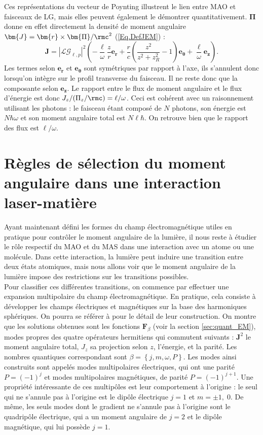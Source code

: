 Ces représentations du vecteur de Poynting illustrent le lien entre MAO et faisceaux de LG, mais elles peuvent également le démontrer quantitativement. $\bm{\Pi}$ donne en effet directement la densité de moment angulaire $\bm{J} = \bm{r}\times\bm{\Pi}/\rmc^2$ (\ref{Eq.DefJEM}) :
\begin{equation*}
\bm{J} = \left|\mathcal{LG}_{\ell,p}\right|^2\left(-\frac{\ell}{\omega}\frac{z}{r}\bm{e_r}+\frac{r}{c}\left(\frac{z^2}{z^2+z_R^2} -1\right)\bm{e_\theta}+\frac{\ell}{\omega}\bm{e_z}\right).
\end{equation*}
Les termes selon $\bm{e_r}$ et $\bm{e_\theta}$ sont symétriques par rapport à l'axe, ils s'annulent donc lorsqu'on intègre sur le profil transverse du faisceau. Il ne reste donc que la composante selon $\bm{e_z}$. Le rapport entre le flux de moment angulaire et le flux d'énergie est donc $J_z/(\Pi_z/\rmc) = \ell/\omega$. Ceci est cohérent avec un raisonnement utilisant les photons : le faisceau étant composé de $N$ photons, son énergie est $N\hbar\omega$ et son moment angulaire total est $N\ell\hbar$. On retrouve bien que le rapport des flux est $\ell/\omega$.

\section{Règles de sélection du moment angulaire dans une interaction laser-matière}
\label{sec:selectionrules}
Ayant maintenant défini les formes du champ électromagnétique utiles en pratique pour contrôler le moment angulaire de la lumière, il nous reste à étudier le rôle respectif du MAO et du MAS dans une interaction avec un atome ou une molécule. Dans cette interaction, la lumière peut induire une transition entre deux états atomiques, mais nous allons voir que le moment angulaire de la lumière impose des restrictions sur les transitions possibles.\\
Pour classifier ces différentes transitions, on commence par effectuer une expansion multipolaire du champ électromagnétique. En pratique, cela consiste à développer les champs électriques et magnétiques sur la base des harmoniques sphériques. On pourra se référer à  pour le détail de leur construction. On montre que les solutions obtenues sont les fonctions $\bm{F}_\beta$ (voir la section \ref{sec:quant_EM}), modes propres des quatre opérateurs hermitiens qui commutent suivants : $\bm{J}^2$ le moment angulaire total, $J_z$ sa projection selon $z$, l'énergie, et la parité. Les nombres quantiques correspondant sont $\beta=\left\{j,m,\omega,P\right\}$. Les modes ainsi construits sont appelés modes multipolaires électriques, qui ont une parité $P=(-1)^j$ et modes multipolaires magnétiques, de parité $P=(-1)^{j+1}$. Une propriété intéressante de ces multipôles est leur comportement à l'origine : le seul qui ne s'annule pas à l'origine est le dipôle électrique $j=1$ et $m=\pm1,\;0$. De même, les seuls modes dont le gradient ne s'annule pas à l'origine sont le quadripôle électrique, qui a un moment angulaire de $j=2$ et le dipôle magnétique, qui lui possède $j=1$.\par

